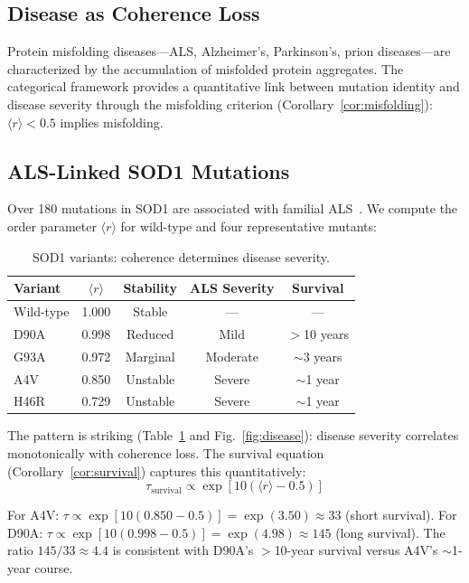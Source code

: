 \documentclass[aps,prx,superscriptaddress,twocolumn,10pt,a4paper,longbibliography,preprint]{revtex4-2}
\newcommand{\orderp}{\langle r \rangle}
\theoremstyle{definition}
\theoremstyle{remark}
\begin{document}
\subsection{Disease as Coherence Loss}

Protein misfolding diseases---ALS, Alzheimer's, Parkinson's, prion diseases---are characterized by the accumulation of misfolded protein aggregates. The categorical framework provides a quantitative link between mutation identity and disease severity through the misfolding criterion (Corollary~\ref{cor:misfolding}): $\orderp < 0.5$ implies misfolding.

\subsection{ALS-Linked SOD1 Mutations}

Over 180 mutations in SOD1 are associated with familial ALS~\cite{Rosen1993}. We compute the order parameter $\orderp$ for wild-type and four representative mutants:

\begin{table}[h]
\centering
\caption{SOD1 variants: coherence determines disease severity.}
\label{tab:disease}
\begin{tabular}{lcccc}
\toprule
Variant & $\orderp$ & Stability & ALS Severity & Survival \\
\midrule
Wild-type & 1.000 & Stable & --- & --- \\
D90A & 0.998 & Reduced & Mild & $>$10 years \\
G93A & 0.972 & Marginal & Moderate & $\sim$3 years \\
A4V & 0.850 & Unstable & Severe & $\sim$1 year \\
H46R & 0.729 & Unstable & Severe & $\sim$1 year \\
\bottomrule
\end{tabular}
\end{table}

The pattern is striking (Table~\ref{tab:disease} and Fig.~\ref{fig:disease}): disease severity correlates monotonically with coherence loss. The survival equation (Corollary~\ref{cor:survival}) captures this quantitatively:
\begin{equation}
\tau_{\text{survival}} \propto \exp\left[10\left(\orderp - 0.5\right)\right]
\end{equation}

For A4V: $\tau \propto \exp[10(0.850 - 0.5)] = \exp(3.50) \approx 33$ (short survival). For D90A: $\tau \propto \exp[10(0.998 - 0.5)] = \exp(4.98) \approx 145$ (long survival). The ratio $145/33 \approx 4.4$ is consistent with D90A's $>$10-year survival versus A4V's $\sim$1-year course.
\end{document}
